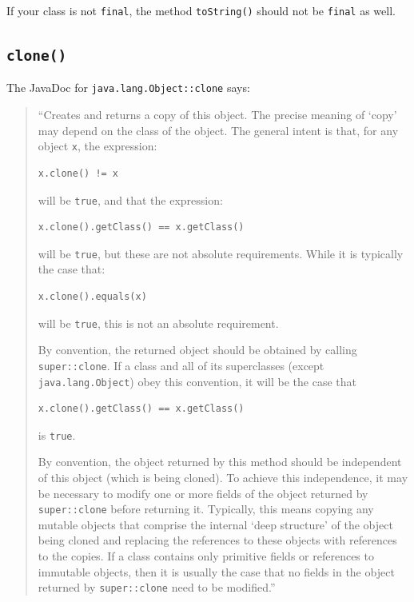 \documentclass[11pt,a4paper, titlepage, parskip=half, headsepline, footsepline, cleardoublepage=current, headheight=1cm]{scrbook}
\begin{document}
If your class is not \lstinline|final|, the method \lstinline|toString()| should not be \lstinline|final| as well. 


\subsection{\lstinline|clone()|}\label{sec:Clone}
The JavaDoc for \lstinline|java.lang.Object::clone|\autocite{ORACLE_DOC_OBJECT:clone} says:

\begin{quote}
“Creates and returns a copy of this object. The precise meaning of ‘copy’ may depend on the class of the object. The general intent is that, for any object \lstinline|x|, the expression:
\begin{lstlisting}
x.clone() != x
\end{lstlisting}

will be \lstinline|true|, and that the expression:
\begin{lstlisting}
x.clone().getClass() == x.getClass()
\end{lstlisting}

will be \lstinline|true|, but these are not absolute requirements. While it is typically the case that:
\begin{lstlisting}
x.clone().equals(x)
\end{lstlisting}
will be \lstinline|true|, this is not an absolute requirement.

By convention, the returned object should be obtained by calling \lstinline|super::clone|. If a class and all of its superclasses (except \lstinline|java.lang.Object|) obey this convention, it will be the case that 
\begin{lstlisting}
x.clone().getClass() == x.getClass()
\end{lstlisting}

is \lstinline|true|.

By convention, the object returned by this method should be independent of this object (which is being cloned). To achieve this independence, it may be necessary to modify one or more fields of the object returned by \lstinline|super::clone| before returning it. Typically, this means copying any mutable objects that comprise the internal ‘deep structure’ of the object being cloned and replacing the references to these objects with references to the copies. If a class contains only primitive fields or references to immutable objects, then it is usually the case that no fields in the object returned by \lstinline|super::clone| need to be modified.”
\end{quote}
\end{document}
